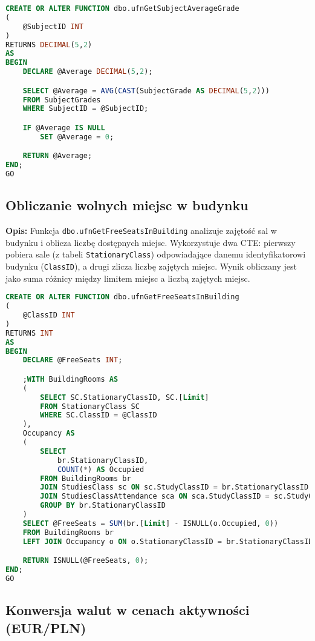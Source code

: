 \documentclass[12pt]{article}
\begin{document}
 
\begin{lstlisting}[language=SQL]
CREATE OR ALTER FUNCTION dbo.ufnGetSubjectAverageGrade
(
    @SubjectID INT
)
RETURNS DECIMAL(5,2)
AS
BEGIN
    DECLARE @Average DECIMAL(5,2);

    SELECT @Average = AVG(CAST(SubjectGrade AS DECIMAL(5,2)))
    FROM SubjectGrades
    WHERE SubjectID = @SubjectID;

    IF @Average IS NULL
        SET @Average = 0;

    RETURN @Average;
END;
GO
\end{lstlisting}

\newpage
\subsection{Obliczanie wolnych miejsc w budynku}
\label{sec:free_seats_building}

\textbf{Opis:} Funkcja \texttt{dbo.ufnGetFreeSeatsInBuilding} analizuje zajętość sal w budynku i oblicza liczbę dostępnych miejsc. Wykorzystuje dwa CTE: pierwszy pobiera sale (z tabeli \texttt{StationaryClass}) odpowiadające danemu identyfikatorowi budynku (\texttt{ClassID}), a drugi zlicza liczbę zajętych miejsc. Wynik obliczany jest jako suma różnicy między limitem miejsc a liczbą zajętych miejsc.

 
\begin{lstlisting}[language=SQL]
CREATE OR ALTER FUNCTION dbo.ufnGetFreeSeatsInBuilding
(
    @ClassID INT
)
RETURNS INT
AS
BEGIN
    DECLARE @FreeSeats INT;

    ;WITH BuildingRooms AS
    (
        SELECT SC.StationaryClassID, SC.[Limit]
        FROM StationaryClass SC
        WHERE SC.ClassID = @ClassID
    ),
    Occupancy AS
    (
        SELECT
            br.StationaryClassID,
            COUNT(*) AS Occupied
        FROM BuildingRooms br
        JOIN StudiesClass sc ON sc.StudyClassID = br.StationaryClassID 
        JOIN StudiesClassAttendance sca ON sca.StudyClassID = sc.StudyClassID
        GROUP BY br.StationaryClassID
    )
    SELECT @FreeSeats = SUM(br.[Limit] - ISNULL(o.Occupied, 0))
    FROM BuildingRooms br
    LEFT JOIN Occupancy o ON o.StationaryClassID = br.StationaryClassID;

    RETURN ISNULL(@FreeSeats, 0);
END;
GO
\end{lstlisting}
\newpage
\subsection{Konwersja walut w cenach aktywności (EUR/PLN)}
\label{sec:convert_price_eur}
\end{document}
